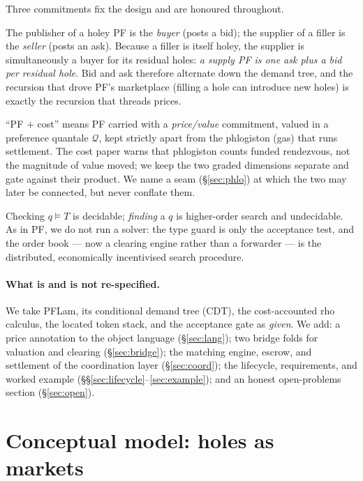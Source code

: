 \documentclass[11pt]{article}
\theoremstyle{definition}
\newcommand{\PF}{\textsf{PF}}
\newcommand{\CDT}{\textsf{CDT}}
\newcommand{\PFLam}{\textsf{PFLam}}
\newcommand{\Qval}{\mathcal{Q}}            %
\newcommand{\modelsT}{\models}
\newcommand{\bid}{\textsf{bid}}
\newcommand{\ask}{\textsf{ask}}
\begin{document}
Three commitments fix the design and are honoured throughout.

\begin{description}[leftmargin=1.4em,style=nextline]
\item[Polarity.] The publisher of a holey \PF{} is the \emph{buyer} (posts a \bid); the supplier of
a filler is the \emph{seller} (posts an \ask). Because a filler is itself holey, the supplier is
simultaneously a buyer for its residual holes: \emph{a supply \PF{} is one ask plus a bid per
residual hole}. Bid and ask therefore alternate down the demand tree, and the recursion that drove
\PF{}'s marketplace (filling a hole can introduce new holes) is exactly the recursion that threads
prices.
\item[Price is not phlogiston.] ``PF $+$ cost'' means \PF{} carried with a \emph{price/value}
commitment, valued in a preference quantale $\Qval$, kept strictly apart from the phlogiston (gas)
that runs settlement. The cost paper warns that phlogiston counts funded rendezvous, not the
magnitude of value moved; we keep the two graded dimensions separate and gate against their
product. We name a seam (\S\ref{sec:phlo}) at which the two may later be connected, but never
conflate them.
\item[Search stays in the market.] Checking $q \modelsT T$ is decidable; \emph{finding} a $q$ is
higher-order search and undecidable. As in \PF{}, we do not run a solver: the type guard is only the
acceptance test, and the order book --- now a clearing engine rather than a forwarder --- is the
distributed, economically incentivised search procedure.
\end{description}

\paragraph{What is and is not re-specified.} We take \PFLam{}, its conditional demand tree
(\CDT), the cost-accounted rho calculus, the located token stack, and the acceptance gate as
\emph{given}. We add: a price annotation to the object language (\S\ref{sec:lang}); two bridge folds
for valuation and clearing (\S\ref{sec:bridge}); the matching engine, escrow, and settlement of the
coordination layer (\S\ref{sec:coord}); the lifecycle, requirements, and worked example
(\S\S\ref{sec:lifecycle}--\ref{sec:example}); and an honest open-problems section
(\S\ref{sec:open}).

\section{Conceptual model: holes as markets}\label{sec:model}
\end{document}
